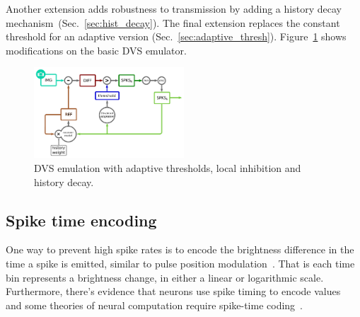 \documentclass[conference]{IEEEtran}
\begin{document}
Another extension adds robustness to transmission by adding a history decay mechanism~(Sec.~\ref{sec:hist_decay}). The final extension replaces the constant threshold for an adaptive version (Sec.~\ref{sec:adaptive_thresh}). Figure~\ref{fig:dvs_emu_inh} shows modifications on the basic DVS emulator.  
\begin{figure}[htb]
  
  \includegraphics[width=0.5\textwidth]{dvs_emu_decay_adapt_inh}
  \caption{DVS emulation with adaptive thresholds, local inhibition and history decay.}
  \label{fig:dvs_emu_inh}
\end{figure}


\subsection{Spike time encoding}
\label{sec:output-modes}

One way to prevent high spike rates is to encode the brightness difference in the time a spike is emitted, similar to pulse position modulation~\cite{book:ppm}. That is each time bin represents a brightness change, in either a linear or logarithmic scale. Furthermore, there's evidence that neurons use spike timing to encode values~\cite{Singer1999189} and some theories of neural computation require spike-time coding~\cite{izhikevich2006polychronization}. 
\end{document}
